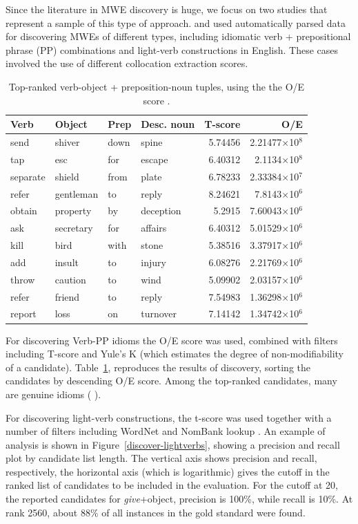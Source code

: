 \documentclass[output=paper]{LSP/langsci}
\begin{document}
{Since the literature in MWE discovery is huge, we focus on two studies that represent a sample of this type of approach.}
\citet{lehmann-schneider2011:verb-pp} and \citet{ronan_schneider_mwe_15}
used automatically parsed data for discovering MWEs of different types, including idiomatic verb + prepositional phrase (PP) combinations and light-verb constructions {in English}. These cases involved the use of different {collocation extraction scores}.

\begin{table}
\begin{tabular}{||llll|r|r||}
\hline \hline
Verb & Object & Prep & Desc. noun & T-score & O/E \\ \hline
send & shiver & down & spine & 5.74456 & 2.21477×10$^8$\\
tap & esc & for & escape & 6.40312 & 2.1134×10$^8$\\
separate & shield & from & plate & 6.78233 & 2.33384×10$^7$\\
refer & gentleman & to & reply & 8.24621 & 7.8143×10$^6$\\
obtain & property & by & deception & 5.2915 & 7.60043×10$^6$\\
ask & secretary & for & affairs & 6.40312 & 5.01529×10$^6$\\
kill & bird & with & stone & 5.38516 & 3.37917×10$^6$\\
add & insult & to & injury & 6.08276 & 2.21769×10$^6$\\
throw & caution & to & wind & 5.09902 & 2.03157×10$^6$\\
refer & friend & to & reply & 7.54983 & 1.36298×10$^6$\\
report & loss & on & turnover & 7.14142 & 1.34742×10$^6$\\ 
\hline \hline
\end{tabular}
\caption{Top-ranked verb-object + preposition-noun tuples, using the the O/E score \citep{lehmann-schneider2011:verb-pp}.}
\label{discover-verb-PP}
\end{table}

For discovering Verb-PP idioms the O/E score was used, combined with filters including T-score and Yule's K (which estimates the degree of non-modifiability of a candidate). 
{Table}~\ref{discover-verb-PP}, reproduces the results of discovery, sorting the candidates by descending O/E score. Among the top-ranked candidates, many are genuine idioms (\eg{} ).


For discovering light-verb constructions, the t-score was used together with a number of filters including WordNet and NomBank lookup \citep{ronan_schneider_mwe_15}. 
An example of analysis is shown in Figure~\ref{discover-lightverbs}, showing a precision and recall plot by candidate list length. The vertical axis shows precision and recall, respectively, the horizontal axis (which is logarithmic) gives the cutoff in the ranked list of candidates to be included in the evaluation. For the cutoff at 20, the reported candidates for \emph{give}+object, precision is 100\%, while recall is 10\%. At rank 2560, about 88\% of all instances in the gold standard were found.
\end{document}
